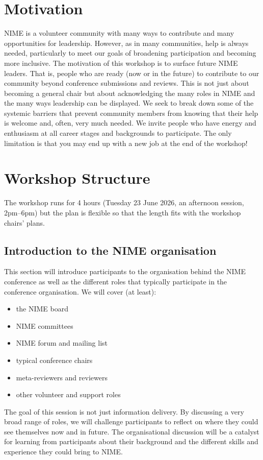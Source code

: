 \documentclass[acmsmall]{nimeart}
\begin{document}

\maketitle

\section{Motivation} 

NIME is a volunteer community with many ways to contribute and many opportunities for leadership. However, as in many communities, help is always needed, particularly to meet our goals of broadening participation and becoming more inclusive. The motivation of this workshop is to surface future NIME leaders. That is, people who are ready (now or in the future) to contribute to our community beyond conference submissions and reviews.
This is not just about becoming a general chair but about acknowledging the many roles in NIME and the many ways leadership can be displayed. We seek to break down some of the systemic barriers that prevent community members from knowing that their help is welcome and, often, very much needed.
We invite people who have energy and enthusiasm at all career stages and backgrounds to participate. The only limitation is that you may end up with a new job at the end of the workshop!

\section{Workshop Structure}

The workshop runs for 4 hours (Tuesday 23 June 2026, an afternoon session, 2pm--6pm) but the plan is flexible so that the length fits with the workshop chairs' plans.

\subsection{Introduction to the NIME organisation}

This section will introduce participants to the organisation behind the NIME conference as well as the different roles that typically participate in the conference organisation. We will cover (at least):
\begin{itemize}
    \item the NIME board
    \item NIME committees
    \item NIME forum and mailing list
    \item typical conference chairs
    \item meta-reviewers and reviewers
    \item other volunteer and support roles
\end{itemize}
The goal of this session is not just information delivery. By discussing a very broad range of roles, we will challenge participants to reflect on where they could see themselves now and in future. The organisational discussion will be a catalyst for learning from participants about their background and the different skills and experience they could bring to NIME.
\end{document}
